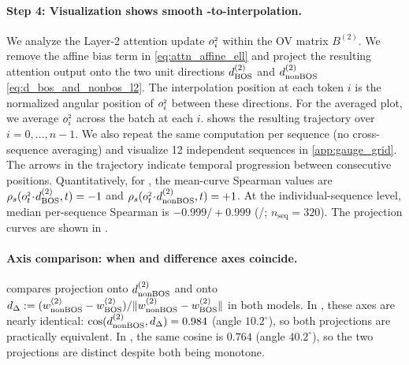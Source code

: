 \documentclass{article}
\theoremstyle{plain}
\theoremstyle{definition}
\theoremstyle{remark}
\begin{document}
\begin{table}[t]
\centering
\small
\caption{\textbf{Layer~2 \bos-bias ratio per head.}
For each head $h$, we compute the \bos-bias metric in \cref{eq:bos_attention_metric}
on \bos-prepended OpenWebText validation sequences, averaged over 1600 sequences.}
\label{tab:block2_bos_ratio}
\setlength{\tabcolsep}{3pt}
\vspace{-2mm}
\end{table}

\paragraph{Step 4: Visualization shows smooth \bos-to-\nbos interpolation.}
We analyze the Layer-2 attention update \(o_{i}^{\scriptscriptstyle 2}\) within the OV matrix \(B^{(2)}\). We remove the affine bias term in \eqref{eq:attn_affine_ell} and project the resulting attention output onto the two unit directions \(d_{\text{BOS}}^{(2)}\) and \(d_{\text{nonBOS}}^{(2)}\) \cref{eq:d_bos_and_nonbos_l2}. The interpolation position at each token \(i\) is the normalized angular position of \(o_{i}^{\scriptscriptstyle 2}\) between these directions. For the averaged plot, we average \(o_{i}^{\scriptscriptstyle 2}\) across the batch at each \(i\).  shows the resulting trajectory over \(i=0,\dots,n-1\). We also repeat the same computation per sequence (no cross-sequence averaging) and visualize 12 independent sequences in \cref{app:gauge_grid}.
The arrows in the trajectory indicate temporal progression between consecutive positions.
Quantitatively, for \modelfull, the mean-curve Spearman values are
\(\rho_s(o_{t}^{\scriptscriptstyle 2}\!\cdot\! d_{\text{BOS}}^{(2)}, t)=-1\) and
\(\rho_s(o_{t}^{\scriptscriptstyle 2}\!\cdot\! d_{\text{nonBOS}}^{(2)}, t)=+1\).
At the individual-sequence level, median per-sequence Spearman is
$-0.999/+0.999$ (\bos/\nbos; $n_{\text{seq}}=320$).
The projection curves are shown in .

\paragraph{Axis comparison: when \nbos and difference axes coincide.}
 compares projection onto $d_{\text{nonBOS}}^{(2)}$ and onto
$d_{\Delta}:=(w_{\text{nonBOS}}^{(2)}-w_{\text{BOS}}^{(2)})/\|w_{\text{nonBOS}}^{(2)}-w_{\text{BOS}}^{(2)}\|$ in both models.
In \modelfull, these axes are nearly identical:
$\cos(d_{\text{nonBOS}}^{(2)},d_{\Delta})=0.984$ (angle $10.2^\circ$),
so both projections are practically equivalent.
In \modelminimal, the same cosine is $0.764$ (angle $40.2^\circ$), so the two projections are distinct despite both being monotone.
\end{document}
